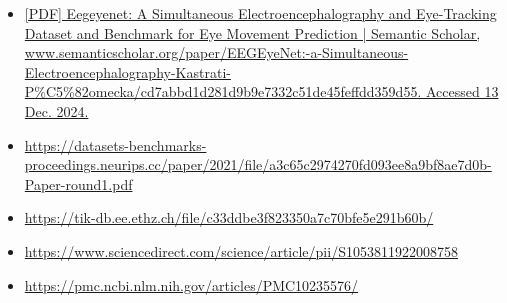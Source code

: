 \documentclass{article}
\begin{document}
\begin{itemize}
    \item 
    \url {[PDF] Eegeyenet: A Simultaneous Electroencephalography and Eye-Tracking Dataset and Benchmark for Eye Movement Prediction | Semantic Scholar, www.semanticscholar.org/paper/EEGEyeNet:-a-Simultaneous-Electroencephalography-Kastrati-P%C5%82omecka/cd7abbd1d281d9b9e7332c51de45feffdd359d55. Accessed 13 Dec. 2024. }
\end{itemize}
\begin{itemize}
    \item 
    \url {https://datasets-benchmarks-proceedings.neurips.cc/paper/2021/file/a3c65c2974270fd093ee8a9bf8ae7d0b-Paper-round1.pdf}
    
    
\end{itemize}
\begin{itemize}
    \item 
    \url {https://tik-db.ee.ethz.ch/file/c33ddbe3f823350a7c70bfe5e291b60b/}
    
\end{itemize}
\begin{itemize}
    \item 
    \url{https://www.sciencedirect.com/science/article/pii/S1053811922008758}
\end{itemize}
\begin{itemize}
    \item 
    \url{https://pmc.ncbi.nlm.nih.gov/articles/PMC10235576/}
\end{itemize}
\end{document}

